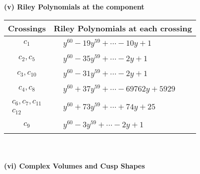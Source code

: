 \documentclass[1p]{elsarticle_modified}
\theoremstyle{definition}
\begin{document}
\newpage\renewcommand{\arraystretch}{1}
\flushleft \textbf{(v) Riley Polynomials at the component}\newline \\
\begin{tabular}{m{50pt}|m{274pt}}
Crossings & \hspace{64pt}Riley Polynomials at each crossing \\
\hline $$\begin{aligned}c_{1}\end{aligned}$$&$\begin{aligned}
&y^{60}-19 y^{59}+\cdots-10 y+1
\end{aligned}$\\
\hline $$\begin{aligned}c_{2},c_{5}\end{aligned}$$&$\begin{aligned}
&y^{60}-35 y^{59}+\cdots-2 y+1
\end{aligned}$\\
\hline $$\begin{aligned}c_{3},c_{10}\end{aligned}$$&$\begin{aligned}
&y^{60}-31 y^{59}+\cdots-2 y+1
\end{aligned}$\\
\hline $$\begin{aligned}c_{4},c_{8}\end{aligned}$$&$\begin{aligned}
&y^{60}+37 y^{59}+\cdots-69762 y+5929
\end{aligned}$\\
\hline $$\begin{aligned}c_{6},c_{7},c_{11}\\c_{12}\end{aligned}$$&$\begin{aligned}
&y^{60}+73 y^{59}+\cdots+74 y+25
\end{aligned}$\\
\hline $$\begin{aligned}c_{9}\end{aligned}$$&$\begin{aligned}
&y^{60}-3 y^{59}+\cdots-2 y+1
\end{aligned}$\\
\hline
\end{tabular}\\~\\
\newpage\flushleft \textbf{(vi) Complex Volumes and Cusp Shapes}
\end{document}
